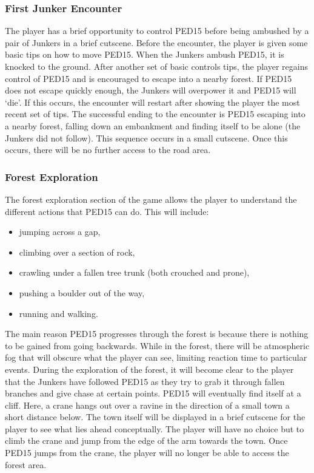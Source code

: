 \documentclass[journal]{IEEEtran}
\begin{document}
\subsubsection{First Junker Encounter}
The player has a brief opportunity to control PED15 before being ambushed by a pair of Junkers in a brief cutscene. Before the encounter, the player is given some basic tips on how to move PED15. When the Junkers ambush PED15, it is knocked to the ground. After another set of basic controls tips, the player regains control of PED15 and is encouraged to escape into a nearby forest. If PED15 does not escape quickly enough, the Junkers will overpower it and PED15 will `die'. If this occurs, the encounter will restart after showing the player the most recent set of tips.
\linebreak\linebreak
The successful ending to the encounter is PED15 escaping into a nearby forest, falling down an embankment and finding itself to be alone (the Junkers did not follow). This sequence occurs in a small cutscene. Once this occurs, there will be no further access to the road area.
\subsubsection{Forest Exploration}
The forest exploration section of the game allows the player to understand the different actions that PED15 can do. This will include:
\begin{itemize}
	\item jumping across a gap,
	\item climbing over a section of rock,
	\item crawling under a fallen tree trunk (both crouched and prone),
	\item pushing a boulder out of the way,
	\item running and walking.
\end{itemize}
The main reason PED15 progresses through the forest is because there is nothing to be gained from going backwards. While in the forest, there will be atmospheric fog that will obscure what the player can see, limiting reaction time to particular events. During the exploration of the forest, it will become clear to the player that the Junkers have followed PED15 as they try to grab it through fallen branches and give chase at certain points. PED15 will eventually find itself at a cliff. Here, a crane hangs out over a ravine in the direction of a small town a short distance below. The town itself will be displayed in a brief cutscene for the player to see what lies ahead conceptually. The player will have no choice but to climb the crane and jump from the edge of the arm towards the town. Once PED15 jumps from the crane, the player will no longer be able to access the forest area.
\end{document}
